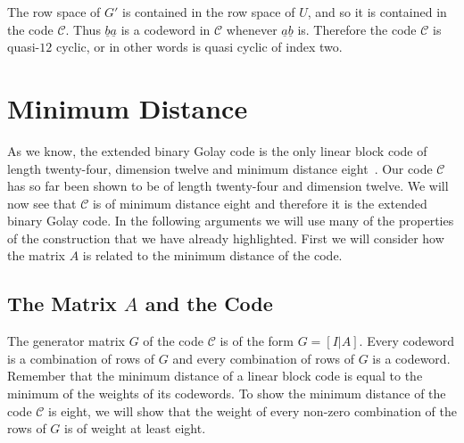 The row space of $G'$ is contained in the row space of $U$, and so it is contained in the code $\mathcal{C}$.
Thus $\underline{b}\underline{a}$ is a codeword in $\mathcal{C}$ whenever $\underline{a}\underline{b}$ is.
Therefore the code $\mathcal{C}$ is quasi-$12$ cyclic, or in other words is quasi cyclic of index two.

\section{Minimum Distance}
\label{sect:golaymindistance}
As we know, the extended binary Golay code is the only linear block code of length twenty-four, dimension twelve and minimum distance eight~\cite[p.~401]{huf03}.
Our code $\mathcal{C}$ has so far been shown to be of length twenty-four and dimension twelve.
We will now see that $\mathcal{C}$ is of minimum distance eight and therefore it is the extended binary Golay code.
In the following arguments we will use many of the properties of the construction that we have already highlighted.
First we will consider how the matrix $A$ is related to the minimum distance of the code.

\subsection{The Matrix $A$ and the Code}
The generator matrix $G$ of the code $\mathcal{C}$ is of the form $G=[I|A]$.
Every codeword is a combination of rows of $G$ and every combination of rows of $G$ is a codeword.
Remember that the minimum distance of a linear block code is equal to the minimum of the weights of its codewords.
To show the minimum distance of the code $\mathcal{C}$ is eight, we will show that the weight of every non-zero combination of the rows of $G$ is of weight at least eight.

